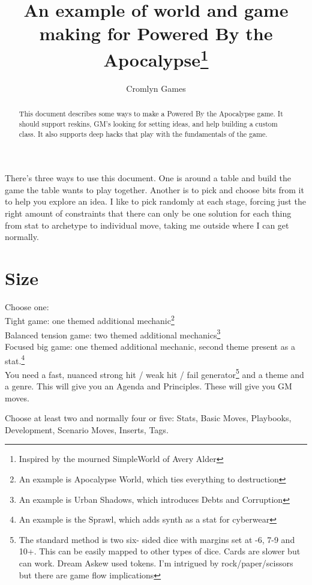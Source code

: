 \documentclass{tufte-handout}
\title{An example of world and game making for Powered By the Apocalypse\thanks{Inspired by the mourned SimpleWorld of Avery Alder}}
\author[Cromlyn Games]{Cromlyn Games}
\begin{document}
\maketitle%

\begin{abstract}
\noindent
This document describes some ways to make  a Powered By the Apocalypse game.
It should support reskins, GM's looking for setting ideas, and help building a custom class.
It also supports deep hacks that play with the fundamentals of the game.
\end{abstract}

There's three ways to use this document. One is around a table and build the game the table wants to play together. Another is to pick and choose bits from it to help you explore an idea. I like to pick randomly at each stage, forcing just the right amount of constraints that there can only be one solution for each thing from stat to archetype to individual move, taking me outside where I can get normally.

\section{Size}
Choose one:\\
Tight game: one themed additional mechanic\footnote{An example is Apocalypse World, which ties everything to destruction} \\
Balanced tension game: two themed additional mechanics\footnote{An example is Urban Shadows, which introduces Debts and Corruption}\\
Focused big game: one themed additional mechanic, second theme present as a stat.\footnote{An example is the Sprawl, which adds synth as a stat for cyberwear}\\


You need a fast, nuanced strong hit / weak hit / fail generator\footnote{The standard method is two six- sided dice with margins set at -6, 7-9 and 10+. This can be easily mapped to other types of dice. Cards are slower but can work. Dream Askew used tokens. I'm intrigued by rock/paper/scissors but there are game flow implications}
 and a theme and a genre. This will give you an Agenda and Principles. These will give you GM moves. 

Choose at least two and normally four or five:
Stats, Basic Moves, Playbooks, Development, Scenario Moves, Inserts, Tags.
\end{document}
